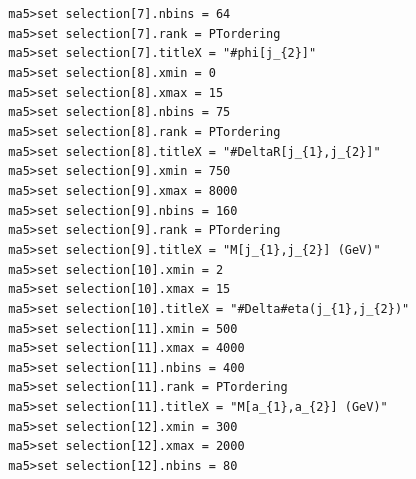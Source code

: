 \documentclass[a4paper, 10pt]{article}
\begin{document}
\texttt{ }\texttt{ }\texttt{ma5>set selection[7].nbins = 64\\
}
\texttt{ }\texttt{ }\texttt{ma5>set selection[7].rank = PTordering\\
}
\texttt{ }\texttt{ }\texttt{ma5>set selection[7].titleX = "\#phi[j\_\{2\}]"\\
}
\texttt{ }\texttt{ }\texttt{ma5>set selection[8].xmin = 0\\
}
\texttt{ }\texttt{ }\texttt{ma5>set selection[8].xmax = 15\\
}
\texttt{ }\texttt{ }\texttt{ma5>set selection[8].nbins = 75\\
}
\texttt{ }\texttt{ }\texttt{ma5>set selection[8].rank = PTordering\\
}
\texttt{ }\texttt{ }\texttt{ma5>set selection[8].titleX = "\#DeltaR[j\_\{1\},j\_\{2\}]"\\
}
\texttt{ }\texttt{ }\texttt{ma5>set selection[9].xmin = 750\\
}
\texttt{ }\texttt{ }\texttt{ma5>set selection[9].xmax = 8000\\
}
\texttt{ }\texttt{ }\texttt{ma5>set selection[9].nbins = 160\\
}
\texttt{ }\texttt{ }\texttt{ma5>set selection[9].rank = PTordering\\
}
\texttt{ }\texttt{ }\texttt{ma5>set selection[9].titleX = "M[j\_\{1\},j\_\{2\}] (GeV)"\\
}
\texttt{ }\texttt{ }\texttt{ma5>set selection[10].xmin = 2\\
}
\texttt{ }\texttt{ }\texttt{ma5>set selection[10].xmax = 15\\
}
\texttt{ }\texttt{ }\texttt{ma5>set selection[10].titleX = "\#Delta\#eta(j\_\{1\},j\_\{2\})"\\
}
\texttt{ }\texttt{ }\texttt{ma5>set selection[11].xmin = 500\\
}
\texttt{ }\texttt{ }\texttt{ma5>set selection[11].xmax = 4000\\
}
\texttt{ }\texttt{ }\texttt{ma5>set selection[11].nbins = 400\\
}
\texttt{ }\texttt{ }\texttt{ma5>set selection[11].rank = PTordering\\
}
\texttt{ }\texttt{ }\texttt{ma5>set selection[11].titleX = "M[a\_\{1\},a\_\{2\}] (GeV)"\\
}
\texttt{ }\texttt{ }\texttt{ma5>set selection[12].xmin = 300\\
}
\texttt{ }\texttt{ }\texttt{ma5>set selection[12].xmax = 2000\\
}
\texttt{ }\texttt{ }\texttt{ma5>set selection[12].nbins = 80\\
}
\end{document}
